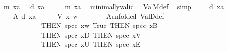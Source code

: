 \begin{isabellebody}
\ \ \ {\isachardoublequoteopen}{\isasymTurnstile}\isactrlsup m\ {\isasymlceil}x\isactrlsup a{\isasymrceil}{\isachardoublequoteclose}\ \ {\isachardoublequoteopen}{\isasymnot}\ {\isasymTurnstile}\isactrlsup d\ x\isactrlsup a{\isachardoublequoteclose}\isanewline
%
\isadelimproof
%
\endisadelimproof
%
\isatagproof
{}\isamarkupfalse%
\ {\isacharminus}{\kern0pt}\isanewline
\ \ \isamarkupfalse%
\ {\isachardoublequoteopen}{\isasymTurnstile}\isactrlsup m\ {\isasymlceil}x\isactrlsup a{\isasymrceil}{\isachardoublequoteclose}\ \isamarkupfalse%
\ minimally{\isacharunderscore}{\kern0pt}valid\ \isamarkupfalse%
\ ValM{\isacharunderscore}{\kern0pt}def\ \isamarkupfalse%
\ simp\isanewline
{}\isamarkupfalse%
\isanewline
\ \ \isamarkupfalse%
\ {\isachardoublequoteopen}{\isasymnot}\ {\isasymTurnstile}\isactrlsup d\ x\isactrlsup a{\isachardoublequoteclose}\isanewline
\ \ \isamarkupfalse%
\isanewline
\ \ \ \ \isamarkupfalse%
\ A{\isacharcolon}{\kern0pt}\ {\isachardoublequoteopen}{\isasymTurnstile}\isactrlsup d\ x\isactrlsup a{\isachardoublequoteclose}\isanewline
\ \ \ \ \isamarkupfalse%
\ {\isachardoublequoteopen}V\ x\ w\isanewline
\ \ \ \ \ \ \isamarkupfalse%
\ A{\isacharbrackleft}{\kern0pt}unfolded\ ValD{\isacharunderscore}{\kern0pt}def{\isacharcomma}{\kern0pt}\isanewline
\ \ \ \ \ \ \ \ \ \ \ \ \ \ THEN\ spec{\isacharbrackleft}{\kern0pt}\ x{\isacharequal}{\kern0pt}{\isachardoublequoteopen}{\isasymlambda}w{\isacharcolon}{\kern0pt}{\isacharcolon}{\kern0pt}{\isasymw}{\isachardot}{\kern0pt}\ True{\isachardoublequoteclose}{\isacharbrackright}{\kern0pt}{\isacharcomma}{\kern0pt}\ THEN\ spec{\isacharbrackleft}{\kern0pt}\ x{\isacharequal}{\kern0pt}B\isanewline
\ \ \ \ \ \ \ \ \ \ \ \ \ \ THEN\ spec{\isacharbrackleft}{\kern0pt}\ x{\isacharequal}{\kern0pt}D\ THEN\ spec{\isacharbrackleft}{\kern0pt}\ x{\isacharequal}{\kern0pt}V{\isacharbrackright}{\kern0pt}{\isacharcomma}{\kern0pt}\isanewline
\ \ \ \ \ \ \ \ \ \ \ \ \ \ THEN\ spec{\isacharbrackleft}{\kern0pt}\ x{\isacharequal}{\kern0pt}U\ THEN\ spec{\isacharbrackleft}{\kern0pt}\ x{\isacharequal}{\kern0pt}E\isanewline

\end{isabellebody}
